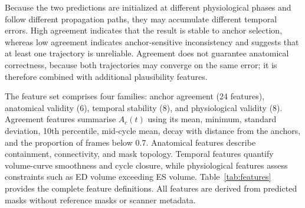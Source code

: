 \documentclass[runningheads]{llncs}
\begin{document}
Because the two predictions are initialized at different physiological phases and follow different propagation paths, they may accumulate different temporal errors. High agreement indicates that the result is stable to anchor selection, whereas low agreement indicates anchor-sensitive inconsistency and suggests that at least one trajectory is unreliable. Agreement does not guarantee anatomical correctness, because both trajectories may converge on the same error; it is therefore combined with additional plausibility features.

The feature set comprises four families: anchor agreement (24 features), anatomical validity (6), temporal stability (8), and physiological validity (8). Agreement features summarise $A_c(t)$ using its mean, minimum, standard deviation, 10th percentile, mid-cycle mean, decay with distance from the anchors, and the proportion of frames below 0.7. Anatomical features describe containment, connectivity, and mask topology. Temporal features quantify volume-curve smoothness and cycle closure, while physiological features assess constraints such as ED volume exceeding ES volume. Table~\ref{tab:features} provides the complete feature definitions. All features are derived from predicted masks without reference masks or scanner metadata.
\end{document}
